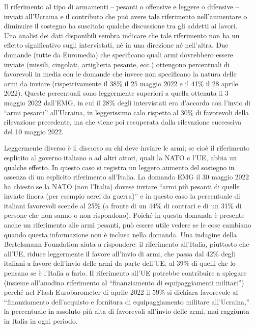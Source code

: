 \documentclass[
  openany]{book}
\begin{document}
Il riferimento al tipo di armamenti -- pesanti o offensive e leggere o difensive -- inviati all'Ucraina e il contributo che può avere tale riferimento nell'aumentare o diminuire il sostegno ha suscitato qualche discussione tra gli addetti ai lavori. Una analisi dei dati disponibili sembra indicare che tale riferimento non ha un effetto significativo sugli intervistati, né in una direzione né nell'altra. Due domande (tutte da Euromedia) che specificano quali armi dovrebbero essere inviate (missili, cingolati, artiglieria pesante, ecc.) ottengono percentuali di favorevoli in media con le domande che invece non specificano la natura delle armi da inviare (rispettivamente il 38\% il 25 maggio 2022 e il 41\% il 28 aprile 2022). Queste percentuali sono leggermente superiori a quella ottenuta il 3 maggio 2022 dall'EMG, in cui il 28\% degli intervistati era d'accordo con l'invio di ``armi pesanti'' all'Ucraina, in leggerissimo calo rispetto al 30\% di favorevoli della rilevazione precedente, ma che viene poi recuperata dalla rilevazione successiva del 10 maggio 2022.

Leggermente diverso è il discorso su chi deve inviare le armi; se cioè il riferimento esplicito al governo italiano o ad altri attori, quali la NATO o l'UE, abbia un qualche effetto. In questo caso si registra un leggero aumento del sostegno in assenza di un esplicito riferimento all'Italia. La domanda EMG il 30 maggio 2022 ha chiesto se la NATO (non l'Italia) dovese inviare ``armi più pesanti di quelle inviate finora (per esempio aerei da guerra)'' e in questo caso la percentuale di italiani favorevoli scende al 25\% (a fronte di un 44\% di contrari e di un 31\% di persone che non sanno o non rispondono). Poiché in questa domanda è presente anche un riferimento alle armi pesanti, può essere utile vedere se le cose cambiano quando questa informazione non è inclusa nella domanda. Una indagine della Bertelsmann Foundation aiuta a rispondere: il riferimento all'Italia, piuttosto che all'UE, riduce leggermente il favore all'invio di armi, che passa dal 42\% degli italiani a favore dell'invio delle armi da parte dell'UE, al 39\% di quelli che lo pensano se è l'Italia a farlo. Il riferimento all'UE potrebbe contribuire a spiegare (insieme all'anodino riferimento al ``finanziamento di equipaggiamenti militari'') perché nel Flash Eurobarometer di aprile 2022 il 59\% si dichiara favorevole al ``finanziamento dell'acquisto e fornitura di equipaggiamento militare all'Ucraina,'' la percentuale in assoluto più alta di favorevoli all'invio delle armi, mai raggiunta in Italia in ogni periodo.
\end{document}
